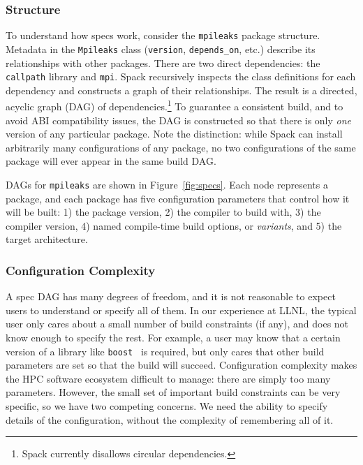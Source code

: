 \subsubsection{Structure}
To understand how specs work, consider the {\tt mpileaks} package structure.
Metadata in the {\tt Mpileaks} class ({\tt version}, {\tt depends\_on}, etc.) describe
its relationships with other packages.  There are two direct dependencies:
the {\tt callpath} library and {\tt mpi}.  Spack recursively inspects the class definitions
for each dependency and constructs a graph of their relationships.  The result
is a directed, acyclic graph (DAG) of dependencies.\footnote{Spack currently disallows
circular dependencies.}
%
To guarantee a consistent build, and to avoid ABI compatibility issues, the DAG
is constructed so that there is only {\it one} version of any particular package.  Note
the distinction: while Spack can install arbitrarily many configurations of any package,
no two configurations of the same package will ever appear in the same build DAG.

DAGs for {\tt mpileaks} are shown in Figure~\ref{fig:specs}.
Each node represents a package, and each package has five configuration parameters that control
how it will be built: 1) the package version, 2) the compiler to
build with, 3) the compiler version, 4) named compile-time build options, or {\it variants},
and 5) the target architecture.


\subsubsection{Configuration Complexity}
A spec DAG has many degrees of freedom, and it is not reasonable to expect users to
understand or specify all of them.  In our experience at LLNL, the typical user
only cares about a small number of build constraints (if any), and does not know enough to
specify the rest. For example, a user may know that a certain version of a library like
{\tt boost}~\cite{boost} is required, but only cares that other build parameters are set so that
the build will succeed.
%
Configuration complexity makes the HPC software ecosystem difficult to manage: there are
simply too many parameters. However, the small set of important build constraints can be
very specific, so we have two competing concerns.  We need the ability to specify details
of the configuration, without the complexity of remembering all of it.

